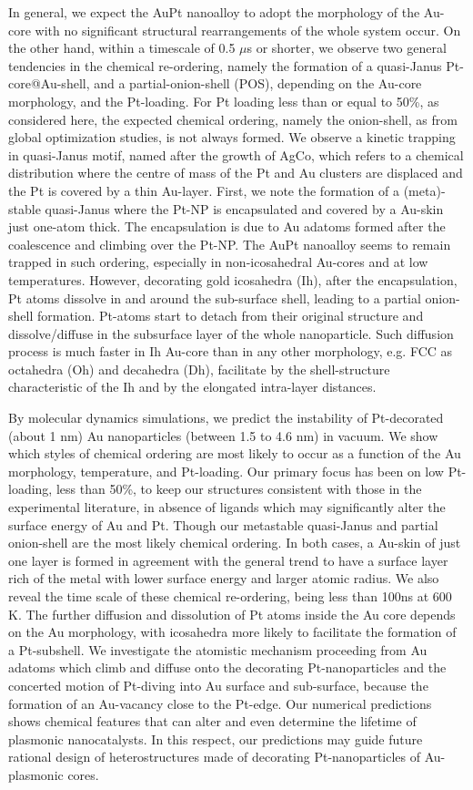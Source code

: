 In general, we expect the AuPt nanoalloy to adopt the morphology of the Au-core with no significant structural rearrangements of the whole system occur. On the other hand, within a  timescale of 0.5 $\mu$s or shorter, we observe two general tendencies in the chemical re-ordering, namely the formation of a quasi-Janus Pt-core@Au-shell, and a partial-onion-shell (POS), depending on the Au-core morphology, and the Pt-loading. For Pt loading less than or equal to 50\%, as considered here, the expected chemical ordering, namely the onion-shell, as from global optimization studies, \cite{Deng2010} is not always formed. We observe a kinetic trapping in  quasi-Janus motif, named after the growth of AgCo\cite{Parsina2010}, which refers to a chemical distribution where the centre of mass of the Pt and Au clusters are displaced and the Pt is covered by a thin Au-layer. 
%
First, we note the formation of a (meta)-stable quasi-Janus where the Pt-NP is encapsulated and covered by a Au-skin just one-atom thick. The encapsulation is due to Au adatoms formed after the coalescence and climbing over the Pt-NP. The AuPt nanoalloy seems to remain trapped in such ordering, especially in non-icosahedral Au-cores and at low temperatures. 
However, decorating gold icosahedra (Ih), after the encapsulation, Pt atoms dissolve in and around the sub-surface shell, leading to a partial onion-shell  formation. Pt-atoms start to detach from their original structure and dissolve/diffuse in the subsurface layer of the whole nanoparticle. Such diffusion process is much faster in Ih Au-core than in any other morphology, e.g. FCC as octahedra (Oh) and decahedra (Dh), facilitate by the shell-structure characteristic of the Ih and by the elongated intra-layer distances.

%
By molecular dynamics simulations, we predict the instability of Pt-decorated (about 1 nm) Au nanoparticles (between 1.5 to 4.6 nm) in vacuum. We show which styles of chemical ordering are most likely to occur as a function of the Au morphology, temperature, and Pt-loading. Our primary focus has been on low Pt-loading, less than 50\%, to keep our structures consistent with those in the experimental literature, in absence of ligands which may significantly alter the surface energy of Au and Pt. Though our metastable quasi-Janus and partial onion-shell are the most likely chemical ordering. In both cases, a Au-skin of just one layer is formed in agreement with the general trend to have a surface layer rich of the metal with lower surface energy and larger atomic radius. We also reveal  the time scale of these chemical re-ordering, being less than 100ns at 600 K. The further diffusion and dissolution of Pt atoms inside the Au core depends on the Au morphology, with icosahedra more likely to facilitate the formation of a Pt-subshell. We investigate the atomistic  mechanism proceeding from Au adatoms which climb and diffuse onto the decorating Pt-nanoparticles and the concerted motion of Pt-diving into Au surface and sub-surface, because the formation of an Au-vacancy close to the Pt-edge. Our numerical predictions shows chemical features that can alter and even determine the lifetime of plasmonic nanocatalysts. In this respect, our predictions may guide future rational design of heterostructures made of decorating Pt-nanoparticles of Au-plasmonic cores.

